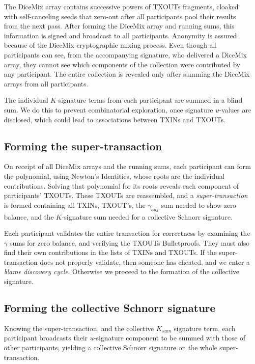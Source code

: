 \documentclass[8pt,fleqn,openany]{book}
\begin{document}
The DiceMix array contains successive powers of TXOUTs fragments, cloaked with self-canceling seeds that zero-out after all participants pool their results from the next pass. After forming the DiceMix array and running sums, this information is signed and broadcast to all participants. Anonymity is assured because of the DiceMix cryptographic mixing process. Even though all participants can see, from the accompanying signature, who delivered a DiceMix array, they cannot see which components of the collection were contributed by any participant. The entire collection is revealed only after summing the DiceMix arrays from all participants.

The individual $K$-signature terms from each participant are summed in a blind sum. We do this to prevent combinatorial exploration, once signature $u$-values are disclosed, which could lead to associations between TXINs and TXOUTs.

\subsection{Forming the super-transaction} 
On receipt of all DiceMix arrays and the running sums, each participant can form the polynomial, using Newton's Identities, whose roots are the individual contributions. Solving that polynomial for its roots reveals each component of participants' TXOUTs. These TXOUTs are reassembled, and a \textit{super-transaction} is formed containing all TXINs, TXOUT's, the $\gamma_{adj}$ sum needed to show zero balance, and the $K$-signature sum needed for a collective Schnorr signature.

Each participant validates the entire transaction for correctness by examining the $\gamma$ sums for zero balance, and verifying the TXOUTs Bulletproofs. They must also find their own contributions in the lists of TXINs and TXOUTs. If the super-transaction does not properly validate, then someone has cheated, and we enter a \textit{blame discovery cycle}. Otherwise we proceed to the formation of the collective signature. 

\subsection{Forming the collective Schnorr signature} 
Knowing the super-transaction, and the collective $K_{sum}$ signature term, each participant broadcasts their $u$-signature component to be summed with those of other participants, yielding a collective Schnorr signature on the whole super-transaction.
\end{document}
